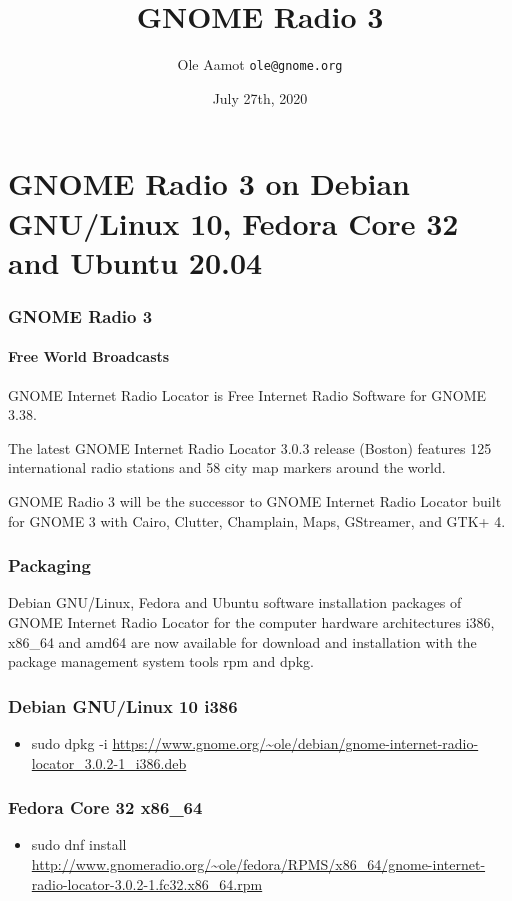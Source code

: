 \documentclass[aspectratio=43]{beamer}
\title[GNOME Radio 3]{GNOME Radio 3}
\author{Ole Aamot \texttt{ole@gnome.org}}
\date{July 27th, 2020}
\begin{document}
\begin{frame}
\titlepage
\end{frame}

\section{GNOME Radio 3 on Debian GNU/Linux 10, Fedora Core 32 and Ubuntu 20.04}

\begin{frame}[containsverbatim]
\frametitle{GNOME Radio 3}
\framesubtitle{Free World Broadcasts}

GNOME Internet Radio Locator is Free Internet Radio Software for GNOME 3.38.

The latest GNOME Internet Radio Locator 3.0.3 release (Boston) features 125
international radio stations and 58 city map markers around the world.

GNOME Radio 3 will be the successor to GNOME Internet Radio Locator built
for GNOME 3 with Cairo, Clutter, Champlain, Maps, GStreamer, and GTK+ 4.
\end{frame}

\begin{frame}
\frametitle{Packaging}

Debian GNU/Linux, Fedora and Ubuntu software installation packages of
GNOME Internet Radio Locator for the computer hardware architectures
i386, x86\_64 and amd64 are now available for download and installation
with the package management system tools rpm and dpkg.

\end{frame}

\begin{frame}
\frametitle{Debian GNU/Linux 10 i386}

    \begin{itemize}
        \item sudo dpkg -i \url{https://www.gnome.org/~ole/debian/gnome-internet-radio-locator_3.0.2-1_i386.deb}
    \end{itemize}

\end{frame}

\begin{frame}
\frametitle{Fedora Core 32 x86\_64}

    \begin{itemize}
        \item sudo dnf install \url{http://www.gnomeradio.org/~ole/fedora/RPMS/x86\_64/gnome-internet-radio-locator-3.0.2-1.fc32.x86\_64.rpm}
    \end{itemize}

\end{frame}
\end{document}
